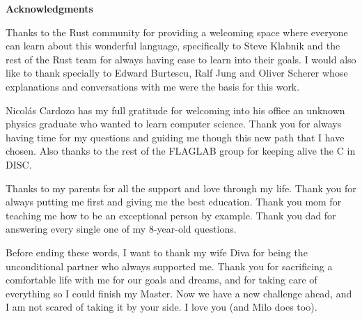 \clearemptydoublepage
{}
{}

\vspace*{2cm}

\begin{center}
{\Large \textbf{Acknowledgments}}
\end{center}

\vspace{1cm}

Thanks to the Rust community for providing a welcoming space where everyone can
learn about this wonderful language, specifically to Steve Klabnik and the rest
of the Rust team for always having ease to learn into their goals. I would also
like to thank specially to Edward Burtescu, Ralf Jung and Oliver Scherer whose
explanations and conversations with me were the basis for this work.

Nicolás Cardozo has my full gratitude for welcoming into his office an unknown
physics graduate who wanted to learn computer science. Thank you for always
having time for my questions and guiding me though this new path that I have
chosen. Also thanks to the rest of the FLAGLAB group for keeping alive the C in
DISC.

Thanks to my parents for all the support and love through my life. Thank you
for always putting me first and giving me the best education. Thank you mom for
teaching me how to be an exceptional person by example. Thank you dad for
answering every single one of my 8-year-old questions.

Before ending these words, I want to thank my wife Diva for being the
unconditional partner who always supported me. Thank you for sacrificing a
comfortable life with me for our goals and dreams, and for taking care of
everything so I could finish my Master. Now we have a new challenge ahead, and
I am not scared of taking it by your side. I love you (and Milo does too).
